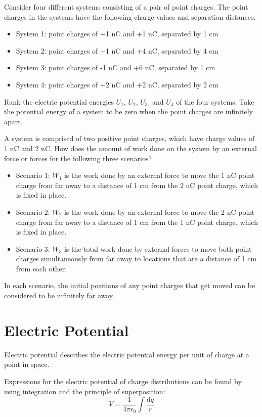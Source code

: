 \documentclass[../em.tex]{subfiles}
\begin{document}
\ex Consider four different systems consisting of a pair of point charges. The point charges in the systems have the following charge values and separation distances.
\begin{itemize}
    \item System 1: point charges of +1 nC and +1 nC, separated by 1 cm 
    \item System 2: point charges of +1 nC and +4 nC, separated by 4 cm 
    \item System 3: point charges of -1 nC and +6 nC, separated by 1 cm 
    \item System 4: point charges of +2 nC and +2 nC, separated by 2 cm
\end{itemize}
Rank the electric potential energies $U_1$, $U_2$, $U_3$. and $U_4$ of the four systems. Take the potential energy of a system to be zero when the point charges are infinitely apart.

\ex A system is comprised of two positive point charges, which have charge values of 1 nC and 2 nC. How does the amount of work done on the system by an external force or forces for the following three scenarios?
\begin{itemize}
    \item Scenario 1: $W_1$ is the work done by an external force to move the 1 nC point charge from far away to a distance of 1 cm from the 2 nC point charge, which is fixed in place.
    \item Scenario 2: $W_2$ is the work done by an external force to move the 2 nC point charge from far away to a distance of 1 cm from the 1 nC point charge, which is fixed in place.
    \item Scenario 3: $W_3$ is the total work done by external forces to move both point charges simultaneously from far away to locations that are a distance of 1 cm from each other.
\end{itemize}
In each scenario, the initial positions of any point charges that get moved can be considered to be infinitely far away.

\section{Electric Potential}
Electric potential describes the electric potential energy per unit of charge at a point in space.

Expressions for the electric potential of charge distributions can be found by
using integration and the principle of superposition:
\[V=\frac{1}{4\pi\epsilon_0}\int \frac{\mathrm{d}q}{r}\]
\end{document}
